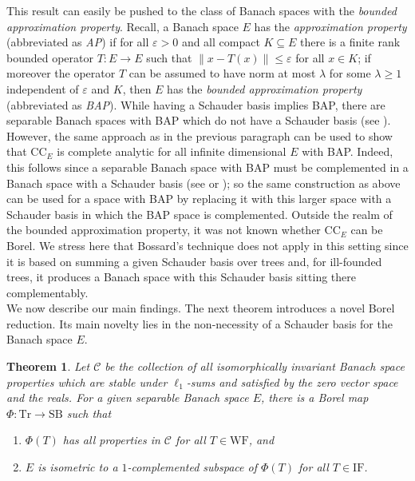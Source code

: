 \documentclass[letterpaper]{amsart}
\numberwithin{equation}{section}
\newtheorem{theorem}{Theorem}[section]
\theoremstyle{definition}
\newcommand{\WF}{\mathrm{WF}}
\newcommand{\IF}{\mathrm{IF}}
\newcommand{\Tr}{\mathrm{Tr}}
\newcommand{\SB}{\mathrm{SB}}
\newcommand{\eps}{\varepsilon}
\begin{document}
 This result can easily be pushed to the class of  Banach spaces with the \emph{bounded approximation property}. Recall, a Banach space $E$ has the \emph{approximation property} (abbreviated as \emph{AP}) if   for all $\eps>0$ and all compact $K\subseteq E$ there is a finite rank bounded operator $T\colon E\to E$    such that $\|x-T(x)\|\leq \eps$ for all $x\in K$; if moreover the operator $T$ can be assumed to have norm at most $\lambda$ for some $\lambda\geq 1$ independent of $\eps$ and $K$, then $E$ has the \emph{bounded approximation property} (abbreviated as \emph{BAP}). While having a Schauder basis implies BAP, there are separable Banach spaces with BAP which do not have a Schauder basis (see \cite[Theorem 1.1]{Szarek1987Acta}). However, the same approach as in the previous paragraph can be used to show that $\mathrm{CC}_E$ is complete analytic for all infinite dimensional $E$ with BAP. Indeed, this follows since  a separable  Banach space   with BAP must be complemented in a Banach space with a Schauder basis (see \cite[Remark 4.13]{JohnsonRosenthalZippin1971Israel} or \cite[Theorem 1]{Pelczynski1971Studia}); so the same construction as above can be used for a space with BAP by replacing it with   this larger space with a Schauder basis in which the BAP space is complemented. Outside the realm of the bounded approximation property, it was not known whether $\mathrm{CC}_E$ can be Borel. We stress here that Bossard's technique does not apply in this setting since it is based on summing a given Schauder basis over trees and, for ill-founded trees, it produces a Banach space with this Schauder basis sitting there complementably. \\

 
We now describe our main findings.  The next theorem introduces a novel Borel reduction. Its main novelty lies in the non-necessity of a Schauder basis for the Banach  space $E$.



\begin{theorem}\label{Theorem.Map.Phi}
Let $\mathcal C$ be the collection of all isomorphically invariant Banach space properties which are stable under $\ell_1$-sums and satisfied by the zero vector space and the reals. For a given separable Banach space $E$, there is a Borel map $\Phi\colon \Tr\to \SB$ such that 
\begin{enumerate}
    \item $\Phi(T)$ has all properties in $\mathcal C$ for all $T\in \WF$, and 
    \item\label{Theorem.Map.Phi.Item2} $E$ is isometric to a $1$-complemented subspace of $\Phi(T)$  for all $T\in \IF$. 
\end{enumerate}
\end{theorem}
\end{document}
